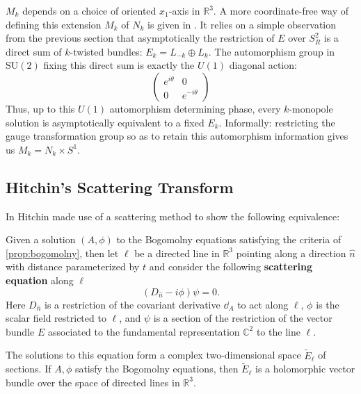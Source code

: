 	\begin{nb}
		$M_k$ depends on a choice of oriented $x_1$-axis in $\mathbb R^3$. A more coordinate-free way of defining this extension $M_k$ of $N_k$ is given in \cite{atiyahhitchin1988}. It relies on a simple observation from the previous section that asymptotically the restriction of $E$ over $S^2_R$ is a direct sum of $k$-twisted bundles: $E_k = L_{-k} \oplus L_{k}$. The automorphism group in $\mathrm{SU}(2)$ fixing this direct sum is exactly the $U(1)$ diagonal action:
		\begin{equation*}
			\begin{pmatrix}
				e^{i\theta} & 0 \\
				0 & e^{-i\theta}
			\end{pmatrix}
		\end{equation*}
		Thus, up to this $U(1)$ automorphism determining phase, every $k$-monopole solution is asymptotically equivalent to a fixed $E_k$. Informally: restricting the gauge transformation group so as to retain this automorphism information gives us $M_k = N_k \times S^1$.
	\end{nb}
		
	\subsection{Hitchin's Scattering Transform}
	In \cite{hitchin1982} Hitchin made use of a scattering method to show the following equivalence:
	\begin{theorem}[Hitchin]
		Given a solution $(A, \phi)$ to the Bogomolny equations satisfying the criteria of \ref{prop:bogomolny}, then let $\ell$ be a directed line in $\mathbb R^3$ pointing along a direction $\hat n$ with distance parameterized by $t$ and consider the following \textbf{scattering equation} along $\ell$
		\begin{equation}
			(D_{\hat n} - i \phi) \psi = 0.
		\end{equation}
		Here $D_{\hat n}$ is a restriction of the covariant derivative $\dd_A$ to act along $\ell$, $\phi$ is the scalar field restricted to $\ell$, and $\psi$ is a section of the restriction of the vector bundle $E$ associated to the fundamental representation $\mathbb C^2$ to the line $\ell$. 
		
		The solutions to this equation form a complex two-dimensional space $\tilde E_{\ell}$ of sections. If $A, \phi$ satisfy the Bogomolny equations, then $\tilde E_\ell$ is a holomorphic vector bundle over the space of directed lines in $\mathbb R^3$.
	\end{theorem}
	
